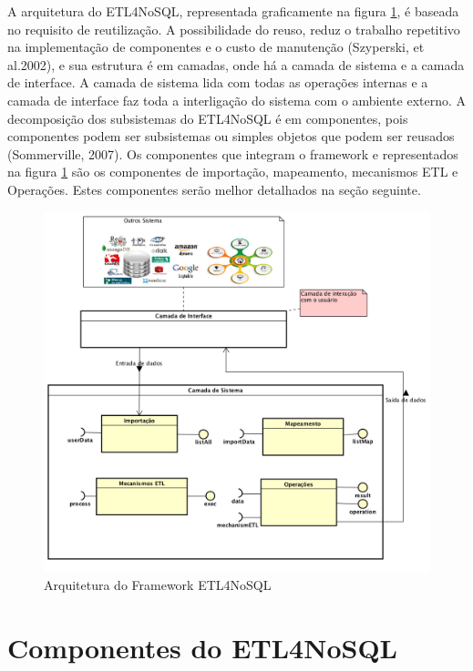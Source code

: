 A arquitetura do ETL4NoSQL, representada graficamente na figura \ref{arquitetura}, é baseada no requisito de reutilização. A possibilidade do reuso, reduz o trabalho repetitivo na implementação de componentes e o custo de manutenção (Szyperski, et al.2002), e sua estrutura é em camadas, onde há a camada de sistema e a camada de interface. A camada de sistema lida com todas as operações internas e a camada de interface faz toda a interligação do sistema com o ambiente externo. A decomposição dos subsistemas do ETL4NoSQL é em componentes, pois componentes podem ser subsistemas ou simples objetos que podem ser reusados (Sommerville, 2007). Os componentes que integram o framework e representados na figura \ref{arquitetura} são os componentes de importação, mapeamento, mecanismos ETL e Operações. Estes componentes serão melhor detalhados na seção seguinte.


\begin{figure}[h]
	\centering
	\includegraphics[scale=0.5]{fig/arquitetura_camadas.png}
	\caption{Arquitetura do Framework ETL4NoSQL}
	\label{arquitetura}
\end{figure}

\section{Componentes do ETL4NoSQL}

